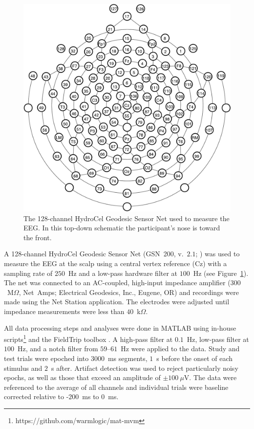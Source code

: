\begin{figure}
  \centering
  \includegraphics[width=.40\textwidth]{./figs/hcgsn_full}
  \caption{The 128-channel HydroCel Geodesic Sensor
    Net\texttrademark{} used to measure the EEG.  In this top-down schematic the participant's nose is toward the front.}
  \label{fig:roi}
\end{figure}

A 128-channel HydroCel Geodesic Sensor Net\texttrademark{} (GSN~200, v.~$2.1$; ) was used to measure the EEG at the scalp using a central vertex reference (Cz) with a sampling rate of $250$~Hz and a low-pass hardware filter at $100$~Hz (see Figure~\ref{fig:roi}).  The net was connected to an AC-coupled, high-input impedance amplifier ($300$~M$\Omega$, Net~Amps\texttrademark{}; Electrical Geodesics, Inc., Eugene, OR) and recordings were made using the Net Station application.  The electrodes were adjusted until impedance measurements were less than $40$~k$\Omega$.

All data processing steps and analyses were done in MATLAB using in-house scripts\footnote{https://github.com/warmlogic/mat-mvm} and the FieldTrip toolbox \cite{OostEtal2011}.  A high-pass filter at $0.1$~Hz, low-pass filter at $100$~Hz, and a notch filter from $59$--$61$~Hz were applied to the data.  Study and test trials were epoched into $3000$~ms segments, $1$~s before the onset of each stimulus and $2$~s after.  Artifact detection was used to reject particularly noisy epochs, as well as those that exceed an amplitude of $\pm100~\mu$V.  The data were referenced to the average of all channels and individual trials were baseline corrected relative to -$200$~ms to $0$~ms.


